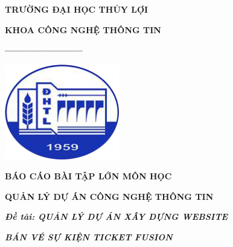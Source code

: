 \documentclass[12pt]{article}
\begin{document}
\begin{titlepage}
    \vspace*{2cm}

    \textbf{\fontsize{18}{22}\selectfont TRƯỜNG ĐẠI HỌC THỦY LỢI} \par
    \textbf{\fontsize{16}{20}\selectfont KHOA CÔNG NGHỆ THÔNG TIN} \par

    \vspace{0.5cm}
    
    \textbf{------------------------} \par

    \vspace{0.5cm}
    
    \includegraphics[width=5cm]{Logo-Thuy_Loi.png}
    
    \vspace{0.5cm}
    
    \textbf{\fontsize{14}{18}\selectfont BÁO CÁO BÀI TẬP LỚN MÔN HỌC} \par
    \textbf{\fontsize{14}{18}\selectfont QUẢN LÝ DỰ ÁN CÔNG NGHỆ THÔNG TIN} \par
    
    \vspace{1cm}
    
    \textbf{\textit{\fontsize{12}{16}\selectfont Đề tài: QUẢN LÝ DỰ ÁN XÂY DỰNG WEBSITE}} \par
    \textbf{\textit{\fontsize{12}{16}\selectfont BÁN VÉ SỰ KIỆN TICKET FUSION}} \par
    
    \vspace{2cm}
    

\end{titlepage}
\end{document}

